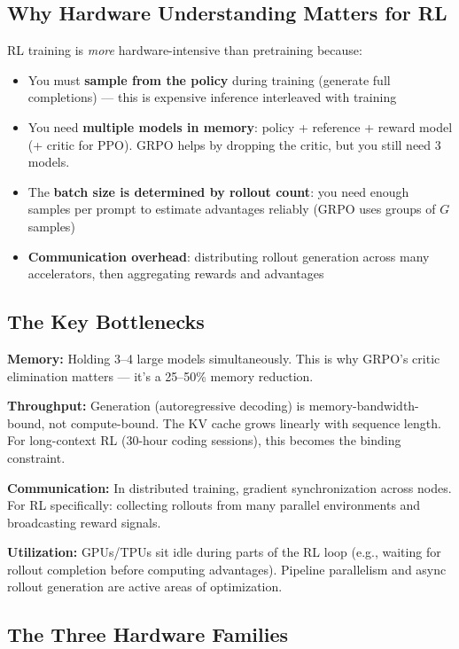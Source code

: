 \subsection{Why Hardware Understanding Matters for RL}

RL training is \textit{more} hardware-intensive than pretraining because:
\begin{itemize}
  \item You must \textbf{sample from the policy} during training (generate full completions) --- this is expensive inference interleaved with training
  \item You need \textbf{multiple models in memory}: policy + reference + reward model (+ critic for PPO). GRPO helps by dropping the critic, but you still need 3 models.
  \item The \textbf{batch size is determined by rollout count}: you need enough samples per prompt to estimate advantages reliably (GRPO uses groups of $G$ samples)
  \item \textbf{Communication overhead}: distributing rollout generation across many accelerators, then aggregating rewards and advantages
\end{itemize}

\subsection{The Key Bottlenecks}

\textbf{Memory:} Holding 3--4 large models simultaneously. This is why GRPO's critic elimination matters --- it's a 25--50\% memory reduction.

\textbf{Throughput:} Generation (autoregressive decoding) is memory-bandwidth-bound, not compute-bound. The KV cache grows linearly with sequence length. For long-context RL (30-hour coding sessions), this becomes the binding constraint.

\textbf{Communication:} In distributed training, gradient synchronization across nodes. For RL specifically: collecting rollouts from many parallel environments and broadcasting reward signals.

\textbf{Utilization:} GPUs/TPUs sit idle during parts of the RL loop (e.g., waiting for rollout completion before computing advantages). Pipeline parallelism and async rollout generation are active areas of optimization.

\subsection{The Three Hardware Families}

